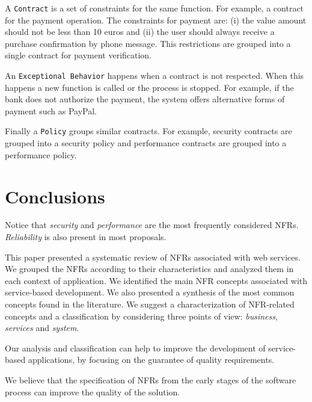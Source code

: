 \documentclass{sig-alternate}
\begin{document}
A \texttt{Contract} is a set of constraints for the same function. For example,
a contract for the payment operation. The constraints for payment are: (i) the
value amount should not be less than 10 euros and (ii) the user should always
receive a purchase confirmation by phone message. This restrictions are
grouped into a single contract for payment verification. 

 
An \texttt{Exceptional Behavior} happens when a contract is not respected. When
this happens a new function is called or the process is stopped. For example, if
the bank does not authorize the payment, the system offers alternative forms
of payment such as PayPal.

Finally a \texttt{Policy} groups similar contracts. For example, security
contracts are grouped into a security policy and performance contracts are
grouped into a performance policy.

\section{Conclusions}
\label{sec:conclusion}
 
 
Notice that \textit{security} and \textit{performance} are the most frequently considered NFRs.
\textit{Reliability} is also present in most proposals.

 
 
 

 
 
This paper presented a systematic review of NFRs associated with web services.
We grouped the NFRs according to their characteristics and analyzed them in each
context of application. 
We identified the main NFR concepts associated with service-based development. 
We also presented a synthesis of the most common concepts found in the literature. 
We suggest a characterization of NFR-related concepts and a classification by considering three points of view: \textit{business}, \textit{services} and \textit{system}. 

Our analysis and classification can help to improve the development of
service-based applications, by focusing on the guarantee of quality requirements. 

We believe that the specification of NFRs from the early stages of the software process
can improve the quality of the solution.
   

 
\end{document}
